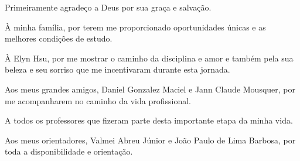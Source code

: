 \begin{agradecimentos}[AGRADECIMENTOS]
Primeiramente agradeço a Deus por sua graça e salvação.

À minha família, por terem me proporcionado oportunidades únicas e as melhores condições de estudo.

À Elyn Hsu, por me mostrar o caminho da disciplina e amor e também pela sua beleza e seu sorriso que me incentivaram durante esta jornada.

Aos meus grandes amigos, Daniel Gonzalez Maciel e Jann Claude Mousquer, por me acompanharem no caminho da vida profissional.

A todos os professores que fizeram parte desta importante etapa da minha vida.

Aos meus orientadores, Valmei Abreu Júnior e João Paulo de Lima Barbosa, por toda a disponibilidade e orientação.


\end{agradecimentos}

